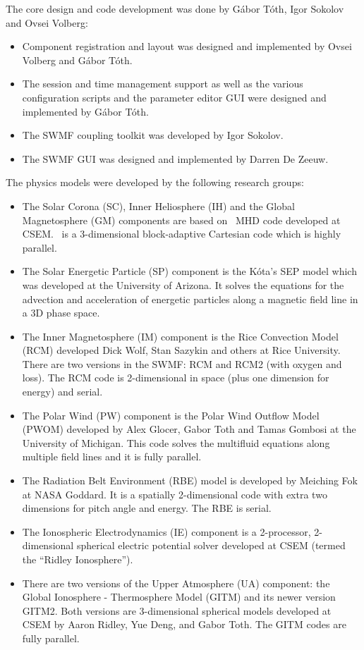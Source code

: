 The core design and code development was done by G\'abor
T\'oth, Igor Sokolov and Ovsei Volberg:
\begin{itemize}
\item Component registration and layout was designed and implemented by 
      Ovsei Volberg and G\'abor T\'oth.
\item The session and time management support as well as the various
      configuration scripts and the parameter editor GUI were designed and
      implemented by G\'abor T\'oth.
\item The SWMF coupling toolkit was developed by Igor Sokolov.
\item The SWMF GUI was designed and implemented by Darren De Zeeuw.
\end{itemize}
The physics models were developed by the following research groups:
\begin{itemize}
\item
The Solar Corona (SC), Inner Heliosphere (IH) and the Global Magnetosphere 
(GM) components are based on \BATSRUS\ MHD code developed at CSEM. 
\BATSRUS\ is a 3-dimensional block-adaptive Cartesian code which is 
highly parallel.

\item
The Solar Energetic Particle (SP) component is the
K\'ota's SEP model which was developed at the University of Arizona.
It solves the equations for the advection and acceleration of
energetic particles along a magnetic field line in a 3D phase space.

\item
The Inner Magnetosphere (IM) component is the Rice Convection Model
(RCM) developed Dick Wolf, Stan Sazykin and others at Rice University. 
There are two versions in the SWMF: RCM and RCM2 (with oxygen and loss). 
The RCM code is 2-dimensional in space 
(plus one dimension for energy) and serial.

\item
The Polar Wind (PW) component is the Polar Wind Outflow Model (PWOM)
developed by Alex Glocer, Gabor Toth and Tamas Gombosi
at the University of Michigan.  This code solves the
multifluid equations along multiple field lines and it is fully parallel.

\item
The Radiation Belt Environment (RBE) model is developed by Meiching Fok
at NASA Goddard. It is a spatially 2-dimensional code with 
extra two dimensions for pitch angle and energy. The RBE is serial.

\item
The Ionospheric Electrodynamics (IE) component is a 2-processor,
2-dimensional spherical electric potential solver developed at CSEM
(termed the ``Ridley Ionosphere'').  

\item
There are two versions of the Upper Atmosphere (UA) component:
the Global Ionosphere - Thermosphere Model (GITM) and its newer
version GITM2. Both versions are 3-dimensional spherical
models developed at CSEM by Aaron Ridley, Yue Deng, and Gabor Toth.  
The GITM codes are fully parallel.

\end{itemize}

